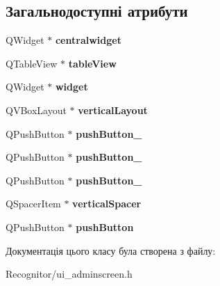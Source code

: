 \subsection*{Загальнодоступні атрибути}
\begin{DoxyCompactItemize}
\item 
\hypertarget{classUi__AdminScreen_abbc19d207f5e5899ac6fc55b5b442546}{Q\-Widget $\ast$ {\bfseries centralwidget}}\label{classUi__AdminScreen_abbc19d207f5e5899ac6fc55b5b442546}

\item 
\hypertarget{classUi__AdminScreen_ac2d4a58e9353f134f489260c898ff9e7}{Q\-Table\-View $\ast$ {\bfseries table\-View}}\label{classUi__AdminScreen_ac2d4a58e9353f134f489260c898ff9e7}

\item 
\hypertarget{classUi__AdminScreen_ade4425196ef0cf5250fdc0f0117133c1}{Q\-Widget $\ast$ {\bfseries widget}}\label{classUi__AdminScreen_ade4425196ef0cf5250fdc0f0117133c1}

\item 
\hypertarget{classUi__AdminScreen_a2bea04b459054994b6691cdfccbb7758}{Q\-V\-Box\-Layout $\ast$ {\bfseries vertical\-Layout}}\label{classUi__AdminScreen_a2bea04b459054994b6691cdfccbb7758}

\item 
\hypertarget{classUi__AdminScreen_a194972de58d0e7f9c589092a9cb466e6}{Q\-Push\-Button $\ast$ {\bfseries push\-Button\-\_}}\label{classUi__AdminScreen_a194972de58d0e7f9c589092a9cb466e6}

\item 
\hypertarget{classUi__AdminScreen_a534291037615f6a4722cab03eb79047a}{Q\-Push\-Button $\ast$ {\bfseries push\-Button\-\_}}\label{classUi__AdminScreen_a534291037615f6a4722cab03eb79047a}

\item 
\hypertarget{classUi__AdminScreen_a1ce119e5fd7876a51086296c650a5b61}{Q\-Push\-Button $\ast$ {\bfseries push\-Button\-\_}}\label{classUi__AdminScreen_a1ce119e5fd7876a51086296c650a5b61}

\item 
\hypertarget{classUi__AdminScreen_aaa26c76977bcafa6c71966ebe72e1a00}{Q\-Spacer\-Item $\ast$ {\bfseries vertical\-Spacer}}\label{classUi__AdminScreen_aaa26c76977bcafa6c71966ebe72e1a00}

\item 
\hypertarget{classUi__AdminScreen_ae745953eb33abb80bed5d6857bd7e933}{Q\-Push\-Button $\ast$ {\bfseries push\-Button}}\label{classUi__AdminScreen_ae745953eb33abb80bed5d6857bd7e933}

\end{DoxyCompactItemize}


Документація цього класу була створена з файлу\-:\begin{DoxyCompactItemize}
\item 
Recognitor/ui\-\_\-adminscreen.\-h\end{DoxyCompactItemize}
